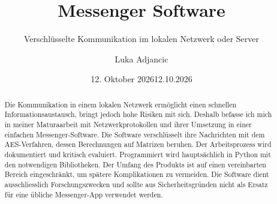 \documentclass[class=4AM]{gymmureport}
\title{Messenger Software}
\subtitle{Verschlüsselte Kommunikation im lokalen Netzwerk oder Server}
\author{Luka Adjancic}
\date{12. Oktober 2026}
\date{12.10.2026}
\begin{document}
\maketitle

\begin{abstract}
Die Kommunikation in einem lokalen Netzwerk ermöglicht einen schnellen Informationsaustausch, bringt jedoch hohe Risiken mit sich. Deshalb befasse ich mich in meiner Maturaarbeit mit Netzwerkprotokollen und ihrer Umsetzung in einer einfachen Messenger-Software. Die Software verschlüsselt ihre Nachrichten mit dem AES-Verfahren, dessen Berechnungen auf Matrizen beruhen. Der Arbeitsprozess wird dokumentiert und kritisch evaluiert. Programmiert wird hauptsächlich in Python mit den notwendigen Bibliotheken. Der Umfang des Produkts ist auf einen vereinbarten Bereich eingeschränkt, um spätere Komplikationen zu vermeiden. Die Software dient ausschliesslich Forschungszwecken und sollte aus Sicherheitsgründen nicht als Ersatz für eine übliche Messenger-App verwendet werden.
\end{abstract}

\tableofcontents




















\end{document}
